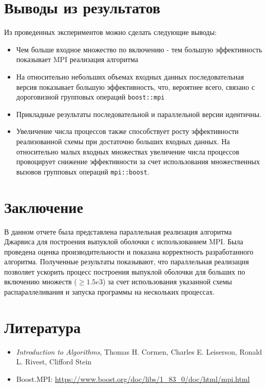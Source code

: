 \documentclass[12pt]{article}
\begin{document}
\section{Выводы из результатов}

Из проведенных экспериментов можно сделать следующие выводы:
\begin{itemize}
  \item Чем больше входное множество по включению - тем большую эффективность показывает MPI реализация алгоритма
    \item На относительно небольших объемах входных данных последовательная версия показывает большую эффективность, что, вероятнее всего, связано с дороговизной групповых операций \texttt{boost::mpi}
    \item Прикладные результаты последовательной и параллельной версии идентичны.
    \item Увеличение числа процессов также способствует росту эффективности реализованной схемы при достаточно больших входных данных. На относительно малых входных множествах увеличение числа процессов провоцирует снижение эффективности за счет использования множественных вызовов групповых операций \texttt{mpi::boost}.
\end{itemize}

\section{Заключение}

В данном отчете была представлена параллельная реализация алгоритма Джарвиса для построения выпуклой оболочки с использованием MPI. Была проведена оценка производительности и показана корректность разработанного алгоритма. Полученные результаты показывают, что параллельная реализация позволяет ускорить процесс построения выпуклой оболочки для больших по включению множеств ($\ge1.5e3$) за счет использования указанной схемы распараллеливания и запуска программы на нескольких процессах.

\section{Литература}

\begin{itemize}
    \item   \textit{Introduction to Algorithms}, Thomas H. Cormen, Charles E. Leiserson, Ronald L. Rivest, Clifford Stein
    \item Boost.MPI: \url{https://www.boost.org/doc/libs/1_83_0/doc/html/mpi.html}
\end{itemize}
\end{document}
